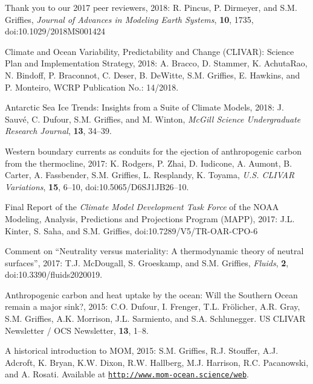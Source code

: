 \begin{etaremune}
\item  Thank you to our 2017 peer reviewers, 2018:  R. Pincus, P. Dirmeyer, and S.M. Grif\/f\/ies, {\it Journal of Advances in Modeling Earth Systems}, {\bf 10}, 1735, doi:10.1029/2018MS001424

\item Climate and Ocean Variability, Predictability and Change (CLIVAR): Science Plan and Implementation Strategy, 2018: A. Bracco, D. Stammer, K. AchutaRao, N. Bindoff, P. Braconnot, C. Deser, B. DeWitte, S.M. Grif\/f\/ies, E. Hawkins, and P. Monteiro, WCRP Publication No.: 14/2018. 

\item Antarctic Sea Ice Trends: Insights from a Suite of Climate Models, 2018: J. Sauv\'{e}, C. Dufour, S.M. Grif\/f\/ies, and M. Winton, {\it McGill Science Undergraduate Research Journal}, {\bf 13}, 34--39. 

\item Western boundary currents as conduits for the ejection of anthropogenic carbon from the thermocline, 2017: K. Rodgers, P. Zhai, D. Iudicone, A. Aumont, B. Carter, A. Fassbender, S.M. Grif\/f\/ies, L. Resplandy, K. Toyama, {\it U.S. CLIVAR Variations}, {\bf 15}, 6--10, doi:10.5065/D6SJ1JB26--10.

\item Final Report of the {\it Climate Model Development Task Force} of the NOAA Modeling, Analysis, Predictions and Projections Program (MAPP), 2017: J.L. Kinter, S. Saha, and S.M. Grif\/fies, doi:10.7289/V5/TR-OAR-CPO-6

\item Comment on ``Neutrality versus materiality: A thermodynamic theory of neutral surfaces'', 2017: T.J. McDougall, S. Groeskamp, and S.M. Grif\/fies, {\it Fluids}, {\bf 2},  doi:10.3390/fluids2020019.

\item Anthropogenic carbon and heat uptake by the ocean: Will the Southern Ocean remain a major sink?, 2015: C.O. Dufour, I. Frenger, T.L. Fr\"{o}licher, A.R. Gray, S.M. Grif\/f\/ies, A.K. Morrison, J.L. Sarmiento, and S.A. Schlunegger.  US CLIVAR Newsletter / OCS Newsletter, {\bf 13}, 1--8.

\item A historical introduction to MOM, 2015: S.M. Grif\/f\/ies, R.J. Stouffer, A.J. Adcroft, K. Bryan, K.W. Dixon, R.W. Hallberg, M.J. Harrison, R.C. Pacanowski, and A. Rosati.  Available at \href{\tt  http://www.mom-ocean.science/web/docs/project/mom_history_v15.09.05.pdf}{\tt http://www.mom-ocean.science/web}.
  

\end{etaremune}
